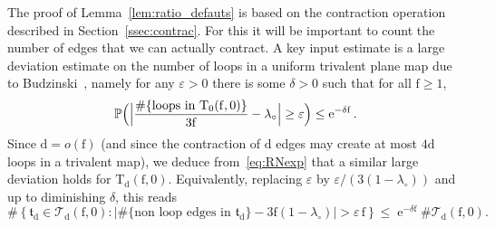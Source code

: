 \documentclass[JEP,XML,SOM,Unicode,NoFloatCountersInSection,NoEqCountersInSection]{cedram}
\theoremstyle{plain}
\theoremstyle{definition}
\theoremstyle{remark}
\renewcommand{\P}{\mathbb{P}}
\newcommand{\e}{\operatorname{e}}
\newcommand{\Triv}{\mathrm{T}}
\newcommand{\face}{\mathrm{f}}
\newcommand{\defect}{\mathrm{d}}
\begin{document}
The proof of Lemma~\ref{lem:ratio_defauts} is based on the contraction operation described in Section~\ref{ssec:contrac}.
For this it will be important to count the number of edges that we can actually contract. A key input estimate is a large deviation estimate on the number of loops in a uniform trivalent plane map due to Budzinski~\cite[Th.\,2]{Bud21}, namely for any $ \varepsilon>0$ there is some $\delta>0$ such that for all $ \face \geq 1$,
\[
\P\Bigl(\Bigl| \frac{\#\{\text{loops in } \Triv_0(\face, 0)\}}{3 \face} - \lambda_{\circ}\Bigr| \geq \varepsilon \Bigr) \leq \e^{-\delta \face}.
\]
Since $ \defect=o(\face)$ (and since the contraction of $ \defect$ edges may create at most $4 \defect$ loops in a trivalent map), we deduce from~\eqref{eq:RNexp} that a similar large deviation holds for $\mathrm{T}_\defect(\face,0)$.
Equivalently, replacing $\varepsilon$ by $\varepsilon/(3(1-\lambda_{\circ}))$ and up to diminishing $ \delta$, this reads
\begin{equation}\label{eq:grande_dev_loops}
\#\left\{\mathfrak{t}_{\defect} \!\in\! \mathcal{T}_\defect(\face, 0) : \left|\#\{\text{non loop edges in } \mathfrak{t}_\defect\} - 3\face(1-\lambda_{\circ})\right| \!>\! \varepsilon\, \face \right\} \le \e^{-\delta \face}\! \# \mathcal{T}_\defect(\face, 0).
\end{equation}
\end{document}

